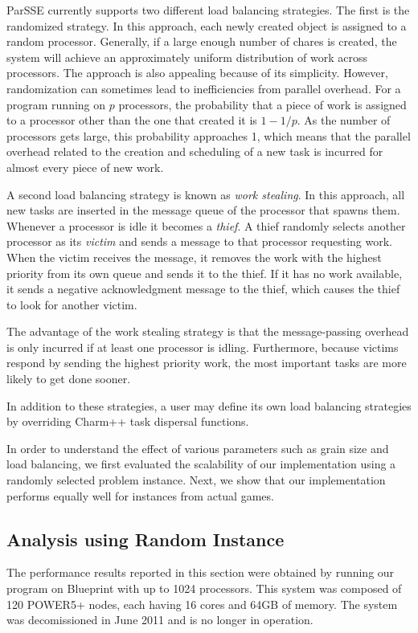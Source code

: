 \documentclass[times, 10pt,twocolumn]{article}
\begin{document}
{\sc ParSSE} currently supports two different load balancing strategies.  The
first is the randomized strategy.  In this approach, each newly created object
is assigned to a random processor.  Generally, if a large enough number of 
chares is created, the system will achieve an approximately uniform
distribution of work across processors.  The approach is also appealing because
of its simplicity. However, randomization can sometimes lead to inefficiencies
from parallel overhead.  For a program running on $p$ processors, the
probability that a piece of work is assigned to a processor other than the
one that created it is $1-1/p$.  As the number of processors gets large, this
probability approaches 1, which means that the parallel overhead related to the
creation and scheduling of a new task is incurred for almost every piece of new
work.
 
A second load balancing strategy is known as {\em work stealing}.  In this
approach, all new tasks are inserted in the message queue of the processor that
spawns them.  Whenever a processor is idle it becomes a {\em thief}.  A thief
randomly selects another processor as its {\em victim} and sends a message to
that processor requesting work.  When the victim receives the message, it
removes the work with the highest priority from its own queue and sends it to
the thief.  If it has no work available, it sends a negative acknowledgment
message to the thief, which causes the thief to look for another victim.

The advantage of the work stealing strategy is that the message-passing
overhead is only incurred if at least one processor is idling.  Furthermore,
because victims respond by sending the highest priority work, the most
important tasks are more likely to get done sooner.  

In addition to these strategies, a user may define its own load balancing
strategies by overriding {\sc Charm++} task dispersal functions.


\label{Results}
In order to understand the effect of various parameters such as grain size and load balancing, we first evaluated the scalability of our implementation using a randomly selected problem instance. Next, we show that our implementation performs equally well for instances from actual games.
\subsection{Analysis using Random Instance}
The performance results reported in
this section were obtained by running our program on Blueprint with up to 1024 processors. This system was composed of 120 POWER5+ nodes, each having 16 cores and 64GB of memory. The system was decomissioned in June 2011 and is no longer in operation.
\end{document}
